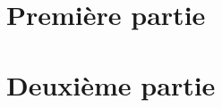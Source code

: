 \documentclass{mise_en_page}
\begin{document}
\maketitle

\begin{historique}
\end{historique}

\tableofcontents
\newpage

\section{Première partie}

\section{Deuxième partie}
\end{document}
